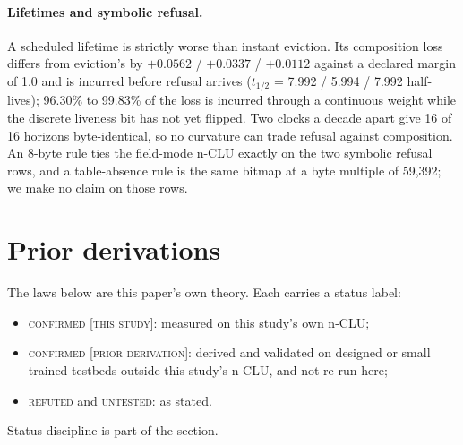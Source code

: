 \documentclass{article} %
\begin{document}
\paragraph{Lifetimes and symbolic refusal.} A scheduled lifetime is strictly worse than instant
eviction. Its composition loss differs from eviction's by $+0.0562$ / $+0.0337$ / $+0.0112$ against a
declared margin of 1.0 and is incurred before refusal arrives ($t_{1/2}$ = 7.992 / 5.994 / %
7.992 half-lives); 96.30\% to 99.83\% of the loss is incurred through a continuous weight while the
discrete liveness bit has not yet flipped. %
Two clocks a decade apart give 16 of 16 horizons byte-identical, so no curvature can trade refusal
against composition. An 8-byte rule ties the field-mode n-CLU exactly on the two symbolic refusal rows,
and a table-absence rule is the same bitmap at a byte multiple of 59,392; we make no claim on those
rows. %

\section{Prior derivations}
\label{app:shorts}

The laws below are this paper's own theory. Each carries a status label:
\begin{itemize}
\item \textsc{confirmed [this study]}: measured on this study's own n-CLU;
\item \textsc{confirmed [prior derivation]}: derived and validated on designed or small trained
  testbeds outside this study's n-CLU, and not re-run here;
\item \textsc{refuted} and \textsc{untested}: as stated.
\end{itemize}
Status discipline is part of the section.
\end{document}
